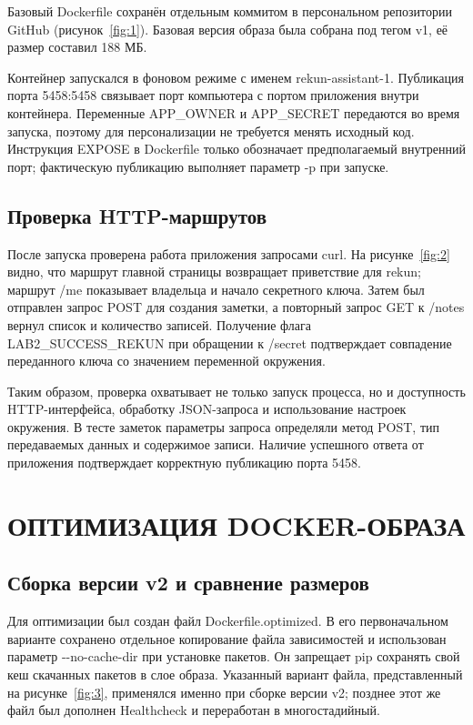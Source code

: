 \documentclass[14pt,a4paper]{extarticle}
\begin{document}
Базовый Dockerfile сохранён отдельным коммитом в персональном репозитории GitHub (рисунок~\ref{fig:1}). Базовая версия образа была собрана под тегом v1, её размер составил 188 МБ.

Контейнер запускался в фоновом режиме с именем rekun-assistant-1. Публикация порта 5458:5458 связывает порт компьютера с портом приложения внутри контейнера. Переменные APP\_OWNER и APP\_SECRET передаются во время запуска, поэтому для персонализации не требуется менять исходный код. Инструкция EXPOSE в Dockerfile только обозначает предполагаемый внутренний порт; фактическую публикацию выполняет параметр -p при запуске.

\subsection{Проверка HTTP-маршрутов}

После запуска проверена работа приложения запросами curl. На рисунке~\ref{fig:2} видно, что маршрут главной страницы возвращает приветствие для rekun; маршрут /me показывает владельца и начало секретного ключа. Затем был отправлен запрос POST для создания заметки, а повторный запрос GET к /notes вернул список и количество записей. Получение флага \mbox{LAB2\_SUCCESS\_REKUN} при обращении к /secret подтверждает совпадение переданного ключа со значением переменной окружения.

Таким образом, проверка охватывает не только запуск процесса, но и доступность HTTP-интерфейса, обработку JSON-запроса и использование настроек окружения. В тесте заметок параметры запроса определяли метод POST, тип передаваемых данных и содержимое записи. Наличие успешного ответа от приложения подтверждает корректную публикацию порта 5458.

\clearpage
\section{ОПТИМИЗАЦИЯ DOCKER-ОБРАЗА}
\subsection{Сборка версии v2 и сравнение размеров}

Для оптимизации был создан файл Dockerfile.optimized. В его первоначальном варианте сохранено отдельное копирование файла зависимостей и использован параметр -{}-no-cache-dir при установке пакетов. Он запрещает pip сохранять свой кеш скачанных пакетов в слое образа. Указанный вариант файла, представленный на рисунке~\ref{fig:3}, применялся именно при сборке версии v2; позднее этот же файл был дополнен Healthcheck и переработан в многостадийный.
\end{document}
